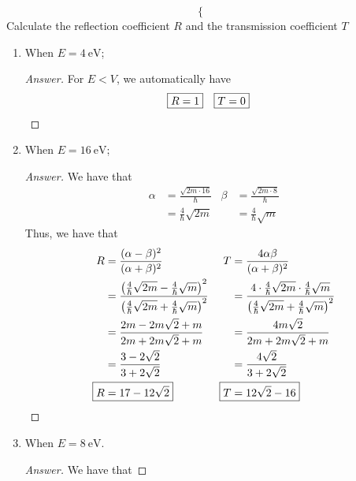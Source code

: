\documentclass[../psets.tex]{subfiles}
\begin{document}
\begin{enumerate}
\begin{equation*}
\begin{cases}
        \end{cases}
    \end{equation*}
    Calculate the reflection coefficient $R$ and the transmission coefficient $T$
    \begin{enumerate}
        \item When $E=\SI{4}{\electronvolt}$;
        \begin{proof}[Answer]
            For $E<V$, we automatically have
            \begin{align*}
                \Aboxed{R &= 1}&
                \Aboxed{T &= 0}
            \end{align*}
        \end{proof}
        \item When $E=\SI{16}{\electronvolt}$;
        \begin{proof}[Answer]
            We have that
            \begin{align*}
                \alpha &= \frac{\sqrt{2m\cdot 16}}{\hbar}&
                    \beta &= \frac{\sqrt{2m\cdot 8}}{\hbar}\\
                &= \frac{4}{\hbar}\sqrt{2m}&
                    &= \frac{4}{\hbar}\sqrt{m}
            \end{align*}
            Thus, we have that
            \begin{align*}
                R &= \frac{(\alpha-\beta)^2}{(\alpha+\beta)^2}&
                    T &= \frac{4\alpha\beta}{(\alpha+\beta)^2}\\
                &= \frac{\left( \frac{4}{\hbar}\sqrt{2m}-\frac{4}{\hbar}\sqrt{m} \right)^2}{\left( \frac{4}{\hbar}\sqrt{2m}+\frac{4}{\hbar}\sqrt{m} \right)^2}&
                    &= \frac{4\cdot\frac{4}{\hbar}\sqrt{2m}\cdot\frac{4}{\hbar}\sqrt{m}}{\left( \frac{4}{\hbar}\sqrt{2m}+\frac{4}{\hbar}\sqrt{m} \right)^2}\\
                &= \frac{2m-2m\sqrt{2}+m}{2m+2m\sqrt{2}+m}&
                    &= \frac{4m\sqrt{2}}{2m+2m\sqrt{2}+m}\\
                &= \frac{3-2\sqrt{2}}{3+2\sqrt{2}}&
                    &= \frac{4\sqrt{2}}{3+2\sqrt{2}}\\
                \Aboxed{R &= 17-12\sqrt{2}}&
                    \Aboxed{T &= 12\sqrt{2}-16}
            \end{align*}
        \end{proof}
        \item When $E=\SI{8}{\electronvolt}$.
        \begin{proof}[Answer]
            We have that

\end{proof}
\end{enumerate}
\end{enumerate}
\end{document}
